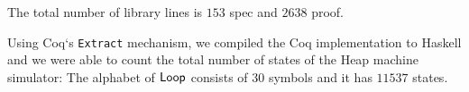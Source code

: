 The total number of library lines is $153$ spec and $2638$ proof.

Using Coq`s \texttt{Extract} mechanism, we compiled the Coq implementation to Haskell and we were able to count the total number of states of the Heap
machine simulator: The alphabet of $\mathsf{Loop}$ consists of $30$ symbols and it has $11537$ states.



